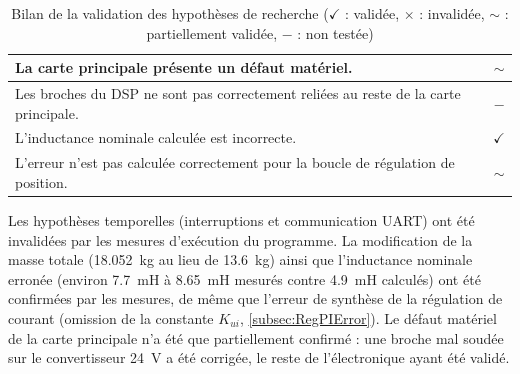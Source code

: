 \begin{table}[htbp]
\begin{tabular}{|p{12cm}|c|}
        \hline
        La carte principale présente un défaut matériel.                                                                                                     & $\sim$         \\
        \hline
        Les broches du DSP ne sont pas correctement reliées au reste de la carte principale.                                                                 & $-$            \\
        \hline
        L'inductance nominale calculée est incorrecte.                                                                                                       & $\checkmark$   \\
        \hline
        L'erreur n'est pas calculée correctement pour la boucle de régulation de position.                                                                   & $\sim$         \\
        \hline
    \end{tabular}
    \vspace{0.3cm}
    \caption{Bilan de la validation des hypothèses de recherche ($\checkmark$ : validée, $\times$ : invalidée, $\sim$ : partiellement validée, $-$ : non testée)}
    \label{tab:bilan_hypotheses}
\end{table}

Les hypothèses temporelles (interruptions et communication UART) ont été invalidées par les mesures d'exécution du programme. La modification de la masse totale (18.052~kg au lieu de 13.6~kg) ainsi que l'inductance nominale erronée (environ 7.7~mH à 8.65~mH mesurés contre 4.9~mH calculés) ont été confirmées par les mesures, de même que l'erreur de synthèse de la régulation de courant (omission de la constante $K_{ui}$, \autoref{subsec:RegPIError}). Le défaut matériel de la carte principale n'a été que partiellement confirmé : une broche mal soudée sur le convertisseur 24~V a été corrigée, le reste de l'électronique ayant été validé.

\vfil
\hspace{8cm}\makeatletter\@author\makeatother\par
\hspace{8cm}\begin{minipage}{5cm}
    \printsignature
\end{minipage}